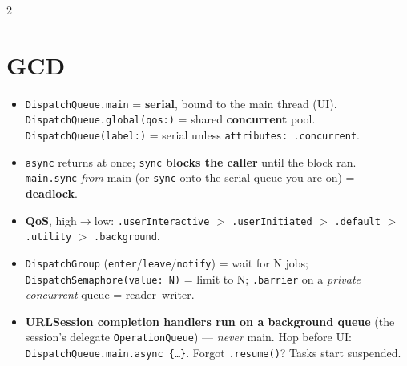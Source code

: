 \documentclass[8pt]{extarticle}
\begin{document}



\begin{multicols}{2}
\raggedright

\section{GCD}
\begin{itemize}
  \item \texttt{DispatchQueue.main} = \textbf{serial}, bound to the main thread
        (UI). \texttt{DispatchQueue.global(qos:)} = shared \textbf{concurrent}
        pool. \texttt{DispatchQueue(label:)} = serial unless
        \texttt{attributes: .concurrent}.
  \item \texttt{async} returns at once; \texttt{sync} \textbf{blocks the caller}
        until the block ran. \texttt{main.sync} \emph{from} main (or
        \texttt{sync} onto the serial queue you are on) = \textbf{deadlock}.
  \item \textbf{QoS}, high$\to$low: \texttt{.userInteractive} $>$
        \texttt{.userInitiated} $>$ \texttt{.default} $>$ \texttt{.utility} $>$
        \texttt{.background}.
  \item \texttt{DispatchGroup} (\texttt{enter}/\texttt{leave}/\texttt{notify})
        = wait for N jobs; \texttt{DispatchSemaphore(value: N)} = limit to N;
        \texttt{.barrier} on a \emph{private concurrent} queue = reader–writer.
  \item \textbf{URLSession completion handlers run on a background queue}
        (the session's delegate \texttt{OperationQueue}) — \emph{never} main.
        Hop before UI: \texttt{DispatchQueue.main.async \{…\}}. Forgot
        \texttt{.resume()}? Tasks start suspended.
\end{itemize}


\end{multicols}
\end{document}
